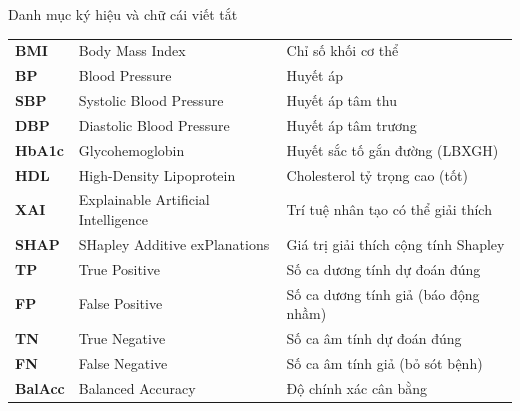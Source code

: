 \documentclass{uetgraduation}
\begin{document}
\begin{contentlisting}
\begin{contentlistingsection}{Danh mục ký hiệu và chữ cái viết tắt}
\begin{longtable}{p{2.5cm} p{6.5cm} p{6.0cm}}
\textbf{BMI}    & Body Mass Index & Chỉ số khối cơ thể \\
\textbf{BP}     & Blood Pressure & Huyết áp \\
\textbf{SBP}    & Systolic Blood Pressure & Huyết áp tâm thu \\
\textbf{DBP}    & Diastolic Blood Pressure & Huyết áp tâm trương \\
\textbf{HbA1c}  & Glycohemoglobin & Huyết sắc tố gắn đường (LBXGH) \\
\textbf{HDL}    & High-Density Lipoprotein & Cholesterol tỷ trọng cao (tốt) \\
\textbf{XAI}    & Explainable Artificial Intelligence & Trí tuệ nhân tạo có thể giải thích \\
\textbf{SHAP}   & SHapley Additive exPlanations & Giá trị giải thích cộng tính Shapley \\
\textbf{TP}     & True Positive & Số ca dương tính dự đoán đúng \\
\textbf{FP}     & False Positive & Số ca dương tính giả (báo động nhầm) \\
\textbf{TN}     & True Negative & Số ca âm tính dự đoán đúng \\
\textbf{FN}     & False Negative & Số ca âm tính giả (bỏ sót bệnh) \\
\textbf{BalAcc} & Balanced Accuracy & Độ chính xác cân bằng \\
\end{longtable}
\end{contentlistingsection}
\end{contentlisting}






\end{document}
